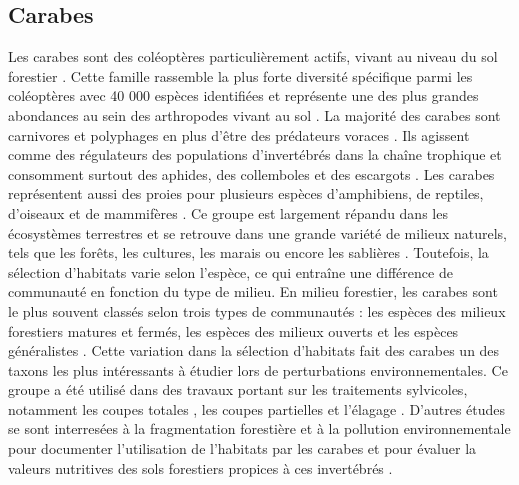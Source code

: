 \subsection*{Carabes}

Les carabes sont des coléoptères particulièrement actifs, vivant au niveau du sol forestier \citep{loveiEcologyBehaviorGround1996,Rochefort2006GroundBeetle}.
Cette famille rassemble la plus forte diversité spécifique parmi les coléoptères avec 40 000 espèces identifiées \citep{Erwin1985taxonpulse} 
et représente une des plus grandes abondances au sein des arthropodes vivant au sol \citep{loveiEcologyBehaviorGround1996,Rochefort2006GroundBeetle}.
La majorité des carabes sont carnivores et polyphages en plus d’être des prédateurs voraces \citep{loveiEcologyBehaviorGround1996}. 
Ils agissent comme des régulateurs des populations d’invertébrés dans la chaîne trophique et consomment surtout des aphides, des collemboles et des escargots \citep{loveiEcologyBehaviorGround1996}. 
Les carabes représentent aussi des proies pour plusieurs espèces d’amphibiens, de reptiles, d’oiseaux et de mammifères \citep{loveiEcologyBehaviorGround1996}. 
Ce groupe est largement répandu dans les écosystèmes terrestres et se retrouve dans une grande variété de milieux naturels, tels que les forêts, les cultures, les marais ou encore les sablières \citep{Larochelle2003naturalhistory}. 
Toutefois, la sélection d'habitats varie selon l'espèce, ce qui entraîne une différence de communauté en fonction du type de milieu.
En milieu forestier, les carabes sont le plus souvent classés selon trois types de communautés : les espèces des milieux forestiers matures et fermés, les espèces des milieux ouverts et les espèces généralistes \citep{Niemela2007effectsforestry}. 
Cette variation dans la sélection d'habitats fait des carabes un des taxons les plus intéressants à étudier lors de perturbations environnementales.
Ce groupe a été utilisé dans des travaux portant sur les traitements sylvicoles, notamment les coupes totales \citep{Niemela1993Effectsclearcut,Heliola2001Distributioncarabid,koivulaBorealCarabidbeetleColeoptera2002a}, 
les coupes partielles et l'élagage \citep{Lemieux2004Groundbeetle,mooreEffectsTwoSilvicultural2004,Peck2004Longertermeffects}.
D'autres études se sont interresées à la fragmentation forestière et à la pollution environnementale pour documenter l'utilisation de l'habitats par les carabes et pour évaluer la valeurs nutritives des sols forestiers propices à ces invertébrés \citep{bouchardBeetleCommunityResponse2016b,Luff1992Classificationprediction,Rainio2003Groundbeetles,Work2008Evaluationcarabid}.

